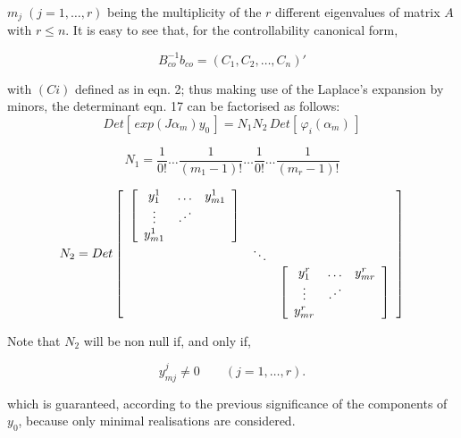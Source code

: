 \documentclass{article}
\newcommand{\adots}{\mathinner{\mkern2mu\raise1pt\hbox{.}\mkern2mu\raise4pt\hbox{.}\mkern2mu\raise7pt\hbox{.}\mkern1mu}}
\begin{document}
$m_j \; (j = 1, \ldots , r)$ being the multiplicity of the $r$
different eigenvalues of matrix $A$ with $r \leq n$. It is easy to
see \cite{Kailath} that, for the controllability canonical form,

\begin{equation}\label{eq:22}
B_{co}^{-1} b_{co}= (C_1,C_2, \ldots, C_n)'
\end{equation}

with $(Ci)$ defined as in eqn. 2; thus making use of the Laplace's
expansion by minors, the determinant eqn. 17 can be factorised as
follows:
\begin{equation}\label{eq:23}
Det[\,exp(J \alpha_m)y_0\,]= N_1 N_2 \, Det[\,\varphi_i(\alpha_m)\,]
\end{equation}

\begin{equation}\label{eq:24}
N_1= \frac{1}{0!}\ldots \frac{1}{(m_1-1)!} \ldots \frac{1}{0!}\ldots \frac{1}{(m_r-1)!}
\end{equation}

\begin{equation}\label{eq:25}
N_2=Det \left[\begin{array}{ccc}
  \left[\begin{array}{ccc}
  y_1^1 & \ldots & y_{m1}^1 \\
  \vdots & \adots & \, \\
  y_{m1}^1 & \, & \, \\
\end{array}\right] & \, & \, \\
  \, & \ddots & \, \\
  \, & \, & \left[\begin{array}{ccc}
  y_1^r & \ldots & y_{mr}^r \\
  \vdots & \adots & \, \\
  y_{mr}^r & \, & \, \\
\end{array}\right] \\
\end{array}\right]
\end{equation}

Note that $N_2$ will be non null if, and only if,

\begin{equation}\label{eq:26}
y_{mj}^j \neq 0 \qquad (j = 1, \ldots, r).
\end{equation}

which is guaranteed, according to the previous significance of the
components of $y_0$, because only minimal realisations are
considered.
\end{document}
